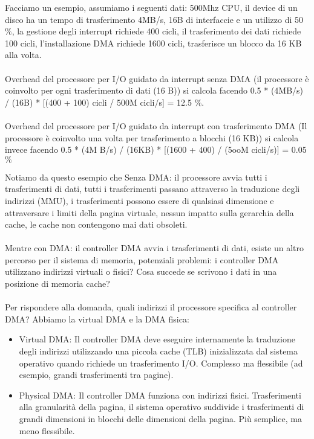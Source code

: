 \begin{example}
    Facciamo un esempio, assumiamo i seguenti dati: 500Mhz CPU, il device di un disco ha un tempo di trasferimento 4MB/s, 16B di interfaccie
    e un utilizzo di 50\(\%\), la gestione degli interrupt richiede 400 cicli, il trasferimento dei dati richiede 100 cicli, l'installazione DMA richiede 1600 cicli, trasferisce un blocco da 16 KB alla volta.\\\\
    Overhead del processore per I/O guidato da interrupt senza DMA (il processore è coinvolto per ogni trasferimento di dati (16 B)) si calcola facendo 0.5 * (4MB/s) / (16B) * [(400 + 100) cicli / 500M cicli/s] = 12.5 \(\%\).\\\\
    Overhead del processore per I/O guidato da interrupt con trasferimento DMA (Il processore è coinvolto una volta per trasferimento a blocchi (16 KB)) si calcola invece facendo 0.5 * (4M B/s) / (16KB) * [(1600 + 400) / (5ooM cicli/s)] = 0.05 \(\%\)
\end{example}
Notiamo da questo esempio che Senza DMA: il processore avvia tutti i trasferimenti di dati, tutti i trasferimenti passano attraverso la traduzione degli indirizzi (MMU), i trasferimenti possono essere di qualsiasi dimensione e attraversare i limiti della pagina virtuale, 
nessun impatto sulla gerarchia della cache, le cache non contengono mai dati obsoleti.\\\\
Mentre con DMA: il controller DMA avvia i trasferimenti di dati, esiste un altro percorso per il sistema di memoria, potenziali problemi: 
i controller DMA utilizzano indirizzi virtuali o fisici? Cosa succede se scrivono i dati in una posizione di memoria cache?\\\\
Per rispondere alla domanda, quali indirizzi il processore specifica al controller DMA? Abbiamo la virtual DMA e la 
DMA fisica:
\begin{itemize}
    \item Virtual DMA: Il controller DMA deve eseguire internamente la traduzione degli indirizzi utilizzando una piccola cache (TLB) inizializzata dal sistema operativo quando richiede un trasferimento I/O. Complesso ma flessibile (ad esempio, grandi trasferimenti tra pagine).
    \item Physical DMA: Il controller DMA funziona con indirizzi fisici. Trasferimenti alla granularità della pagina, il sistema operativo suddivide i trasferimenti di grandi dimensioni in blocchi delle dimensioni della pagina. Più semplice, ma meno flessibile.
\end{itemize}
